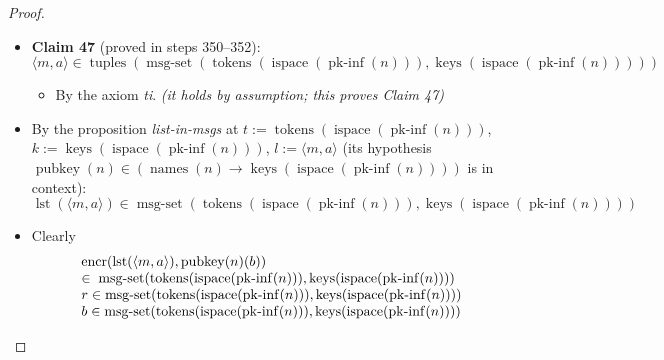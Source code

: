\documentclass[11pt]{article}
\theoremstyle{plain}
\begin{document}
\begin{proof}
\begin{itemize}[leftmargin=2.8em, itemsep=4pt, parsep=1pt]
\begin{itemize}[leftmargin=2.8em, itemsep=4pt, parsep=1pt]
  \item[\textbf{349}] \textbf{Claim 47} (proved in steps 350--352):
\begin{equation*}
\langle m, a \rangle \in \operatorname{tuples}(\operatorname{msg\text{-}set}(\operatorname{tokens}(\operatorname{ispace}(\operatorname{pk\text{-}inf}(n))), \operatorname{keys}(\operatorname{ispace}(\operatorname{pk\text{-}inf}(n)))))
\end{equation*}

  \begin{itemize}[leftmargin=2.8em, itemsep=4pt, parsep=1pt]
  \item[\textbf{350--352}] By the axiom \emph{ti}.  \emph{(it holds by assumption; this proves Claim 47)}
  \end{itemize}
  \item[\textbf{353}] By the proposition \emph{list-in-msgs} at $t := \operatorname{tokens}(\operatorname{ispace}(\operatorname{pk\text{-}inf}(n)))$, $k := \operatorname{keys}(\operatorname{ispace}(\operatorname{pk\text{-}inf}(n)))$, $l := \langle m, a \rangle$ (its hypothesis $\operatorname{pubkey}(n) \in (\operatorname{names}(n) \to \operatorname{keys}(\operatorname{ispace}(\operatorname{pk\text{-}inf}(n))))$ is in context):
\begin{equation*}
\operatorname{lst}(\langle m, a \rangle) \in \operatorname{msg\text{-}set}(\operatorname{tokens}(\operatorname{ispace}(\operatorname{pk\text{-}inf}(n))), \operatorname{keys}(\operatorname{ispace}(\operatorname{pk\text{-}inf}(n))))
\end{equation*}

  \item[\textbf{354--356}] Clearly
\begin{equation*}
\begin{array}{@{}l@{}}
\begin{array}{@{}l@{}} \operatorname{encr}(\operatorname{lst}(\langle m, a \rangle), \operatorname{pubkey}(n)(b)) \\ \in\; \operatorname{msg\text{-}set}(\operatorname{tokens}(\operatorname{ispace}(\operatorname{pk\text{-}inf}(n))), \operatorname{keys}(\operatorname{ispace}(\operatorname{pk\text{-}inf}(n)))) \end{array} \\
r \in \operatorname{msg\text{-}set}(\operatorname{tokens}(\operatorname{ispace}(\operatorname{pk\text{-}inf}(n))), \operatorname{keys}(\operatorname{ispace}(\operatorname{pk\text{-}inf}(n)))) \\
b \in \operatorname{msg\text{-}set}(\operatorname{tokens}(\operatorname{ispace}(\operatorname{pk\text{-}inf}(n))), \operatorname{keys}(\operatorname{ispace}(\operatorname{pk\text{-}inf}(n))))
\end{array}
\end{equation*}


\end{itemize}
\end{itemize}
\end{proof}
\end{document}
